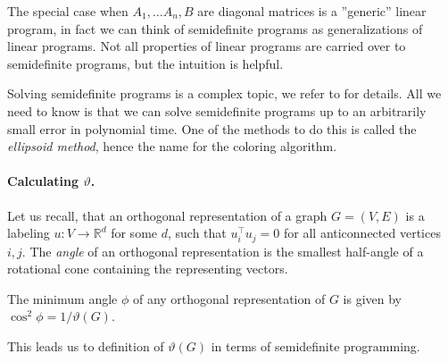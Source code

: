 The special case when $A_1, \ldots A_n, B$ are diagonal matrices is a ''generic'' linear program, in fact we can think of semidefinite programs as generalizations of linear programs. Not all properties of linear programs are carried over to semidefinite programs, but the intuition is helpful.

Solving semidefinite programs is a complex topic, we refer to \cite{grotschel1993} for details. All we need to know is that we can solve semidefinite programs up to an arbitrarily small error in polynomial time. One of the methods to do this is called the \emph{ellipsoid method}, hence the name for the coloring algorithm.

\paragraph{Calculating \boldmath$\vartheta$.}

Let us recall, that an orthogonal representation of a graph $G = (V, E)$ is a labeling $u: V \rightarrow \mathbb{R}^d$ for some $d$, such that $u_i^\intercal u_j = 0$ for all anticonnected vertices $i, j$. The \emph{angle} of an orthogonal representation is the smallest half-angle of a rotational cone containing the representing vectors.

\begin{theorem}
  The minimum angle $\phi$ of any orthogonal representation of $G$ is given by $\cos^2\phi = 1/\vartheta(G)$.
\end{theorem}

This leads us to definition of $\vartheta(G)$ in terms of semidefinite programming.

